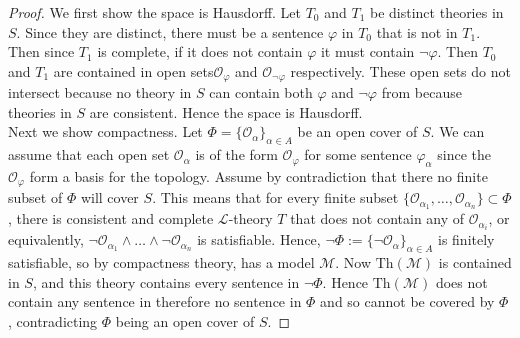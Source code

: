 \documentclass{article}
\begin{document}
\begin{enumerate}
    \begin{proof}
      We first show the space is Hausdorff. Let $T_0$ and $T_1$ be distinct
      theories in $S$. Since they are distinct, there must be a sentence
      $\varphi$ in $T_0$ that is not in $T_1$. Then since $T_1$ is
      complete, if it does not contain $\varphi$ it must contain
      $\neg\varphi$. Then $T_0$ and $T_1$ are contained in open
      sets$\mathcal{O}_\varphi$ and $\mathcal{O}_{\neg\varphi}$
      respectively. These open sets do not intersect because no theory in
      $S$ can contain both $\varphi$ and $\neg\varphi$ from because
      theories in $S$ are consistent. Hence the space is Hausdorff. \\

      Next we show compactness. Let $\Phi=\{\mathcal{O}_\alpha\}_{\alpha\in
      A}$ be an open cover of $S$. We can assume that each open set
      $\mathcal{O}_\alpha$ is of the form $\mathcal{O}_{\varphi}$ for some
      sentence $\varphi_\alpha$ since the $\mathcal{O}_\varphi$ form a
      basis for the topology. Assume by contradiction that there no finite
      subset of $\Phi$ will cover $S$. This means that for every finite
      subset
      $\{\mathcal{O}_{\alpha_1},\ldots,\mathcal{O}_{\alpha_n}\}\subset\Phi$,
      there is consistent and complete $\mathcal{L}$-theory $T$ that does
      not contain any of $\mathcal{O}_{\alpha_i}$, or equivalently,
      $\neg\mathcal{O}_{\alpha_1}\wedge\ldots\wedge\neg\mathcal{O}_{\alpha_n}$
      is satisfiable. Hence,
      $\neg\Phi:=\{\neg\mathcal{O}_\alpha\}_{\alpha\in A}$ is finitely
      satisfiable, so by compactness theory, has a model $\mathcal{M}$.
      Now $\text{Th}(\mathcal{M})$ is contained in $S$, and this theory
      contains every sentence in $\neg\Phi$. Hence $\text{Th}(\mathcal{M})$
      does not contain any sentence in therefore no sentence in $\Phi$ and
      so cannot be covered by $\Phi$, contradicting $\Phi$ being an open
      cover of $S$.
    \end{proof}


\end{enumerate}
\end{document}
